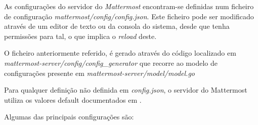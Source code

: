 As configurações do servidor do \textit{Mattermost} encontram-se definidas num ficheiro de configuração \textit{mattermost/config/config.json}. Este ficheiro pode ser modificado através de um editor de texto ou da consola do sistema, desde que tenha permissões para tal, o que implica o \textit{reload} deste.
\par
O ficheiro anteriormente referido, é gerado através do código localizado em \textit{mattermost-server/config/config\_generator} que recorre ao modelo de configurações presente em \textit{mattermost-server/model/model.go} 
\par
Para qualquer definição não definida em \textit{config.json}, o servidor do Mattermost utiliza os valores default documentados em \cite{configuration_settings}.
\par
Algumas das principais configurações são:

